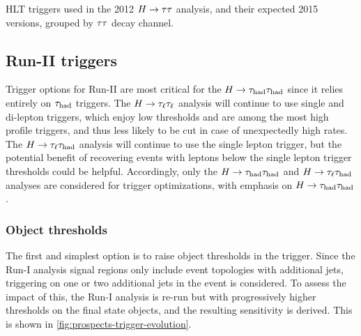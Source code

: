 \begin{table}[bp] 
  \centering
  \renewcommand{\arraystretch}{1.4}
  \caption{HLT triggers used in the 2012 $H\rightarrow\tau\tau$ analysis, and their expected 2015 versions, grouped by $\tau\tau$ decay channel.}
  
  \label{tab:prospects-triggersHLT}
\end{table}

\clearpage
\subsection{Run-II triggers}

Trigger options for Run-II are most critical for the $H\rightarrow\tau_\text{had}\tau_\text{had}$ since it relies entirely on $\tau_\text{had}$ triggers. The $H\rightarrow\tau_\ell\tau_\ell$ analysis will continue to use single and di-lepton triggers, which enjoy low thresholds and are among the most high profile triggers, and thus less likely to be cut in case of unexpectedly high rates. The $H\rightarrow\tau_\ell\tau_\text{had}$ analysis will continue to use the single lepton trigger, but the potential benefit of recovering events with leptons below the single lepton trigger thresholds could be helpful. Accordingly, only the $H\rightarrow\tau_\text{had}\tau_\text{had}$ and $H\rightarrow\tau_\ell\tau_\text{had}$ analyses are considered for trigger optimizations, with emphasis on $H\rightarrow\tau_\text{had}\tau_\text{had}$.

\subsubsection{Object thresholds}

The first and simplest option is to raise object thresholds in the trigger. Since the Run-I analysis signal regions only include event topologies with additional jets, triggering on one or two additional jets in the event is considered. To assess the impact of this, the Run-I analysis is re-run but with progressively higher thresholds on the final state objects, and the resulting sensitivity is derived. This is shown in \cref{fig:prospects-trigger-evolution}.


